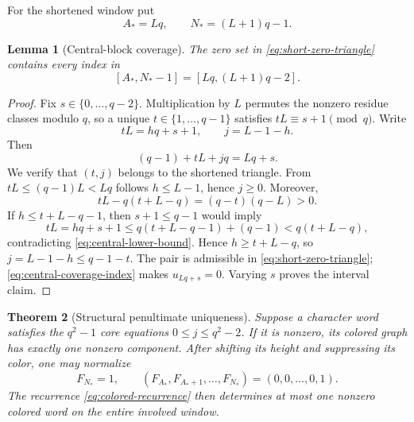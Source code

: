 \documentclass[11pt]{article}
\newtheorem{lemma}{Lemma}[section]
\newtheorem{theorem}[lemma]{Theorem}
\theoremstyle{remark}
\numberwithin{equation}{section}
\begin{document}
For the shortened window put
\begin{equation}\label{eq:Astar-Nstar}
 A_\ast=Lq,\qquad N_\ast=(L+1)q-1.
\end{equation}

\begin{lemma}[Central-block coverage]\label{lem:central-coverage}
The zero set in \eqref{eq:short-zero-triangle} contains every index in
\[
 [A_\ast,N_\ast-1]=[Lq,(L+1)q-2].
\]
\end{lemma}

\begin{proof}
Fix \(s\in\{0,\ldots,q-2\}\).  Multiplication by \(L\) permutes the nonzero residue classes modulo \(q\), so a unique \(t\in\{1,\ldots,q-1\}\) satisfies \(tL\equiv s+1\pmod q\).  Write
\[
 tL=hq+s+1,\qquad j=L-1-h.
\]
Then
\begin{equation}\label{eq:central-coverage-index}
 (q-1)+tL+jq=Lq+s.
\end{equation}
We verify that \((t,j)\) belongs to the shortened triangle.  From
\(tL\leq(q-1)L<Lq\) follows \(h\leq L-1\), hence \(j\geq0\).  Moreover,
\begin{equation}\label{eq:central-lower-bound}
 tL-q(t+L-q)=(q-t)(q-L)>0.
\end{equation}
If \(h\leq t+L-q-1\), then \(s+1\leq q-1\) would imply
\[
 tL=hq+s+1
 \leq q(t+L-q-1)+(q-1)<q(t+L-q),
\]
contradicting \eqref{eq:central-lower-bound}.  Hence \(h\geq t+L-q\), so \(j=L-1-h\leq q-1-t\).  The pair is admissible in \eqref{eq:short-zero-triangle}; \eqref{eq:central-coverage-index} makes \(u_{Lq+s}=0\).  Varying \(s\) proves the interval claim.
\end{proof}

\begin{theorem}[Structural penultimate uniqueness]\label{thm:structural-uniqueness}
Suppose a character word satisfies the \(q^2-1\) core equations \(0\leq j\leq q^2-2\).  If it is nonzero, its colored graph has exactly one nonzero component.  After shifting its height and suppressing its color, one may normalize
\begin{equation}\label{eq:central-delta-block}
 F_{N_\ast}=1,\qquad
 (F_{A_\ast},F_{A_\ast+1},\ldots,F_{N_\ast})=(0,0,\ldots,0,1).
\end{equation}
The recurrence \eqref{eq:colored-recurrence} then determines at most one nonzero colored word on the entire involved window.
\end{theorem}
\end{document}
